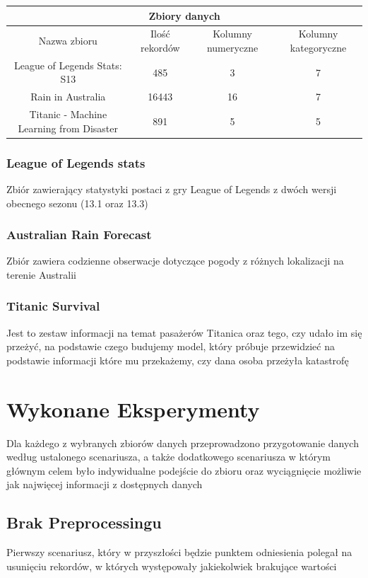 \documentclass{book}
\begin{document}
\begin{center}
    \begin{tabular}{ |c|c|c|c| } 
    \hline
    \multicolumn{4}{|c|}{Zbiory danych} \\
    \hline
    Nazwa zbioru & Ilość rekordów & Kolumny numeryczne & Kolumny kategoryczne \\
     \hline
     League of Legends Stats: S13 & 485 & 3 & 7\\ 
     Rain in Australia & 16443 & 16 & 7\\ 
     Titanic - Machine Learning from Disaster & 891 & 5 & 5\\ 
     \hline
    \end{tabular}
    \end{center}
\subsection{League of Legends stats}
Zbiór zawierający statystyki postaci z gry League of Legends z 
dwóch wersji obecnego sezonu (13.1 oraz 13.3)
\subsection{Australian Rain Forecast}
Zbiór zawiera codzienne obserwacje dotyczące pogody z różnych 
lokalizacji na terenie Australii
\subsection{Titanic Survival}
Jest to zestaw informacji na temat pasażerów Titanica oraz tego, 
czy udało im się przeżyć, na podstawie czego budujemy model, 
który próbuje przewidzieć na podstawie informacji które mu przekażemy, 
czy dana osoba przeżyła katastrofę

\chapter{Wykonane Eksperymenty}
Dla każdego z wybranych zbiorów danych przeprowadzono 
przygotowanie danych według ustalonego scenariusza, 
a także dodatkowego scenariusza w którym głównym celem było 
indywidualne podejście do zbioru oraz wyciągnięcie możliwie 
jak najwięcej informacji z dostępnych danych
\section{Brak Preprocessingu}
Pierwszy scenariusz, który w przyszłości 
będzie punktem odniesienia polegał na usunięciu rekordów, 
w których występowały jakiekolwiek brakujące wartości
\end{document}
